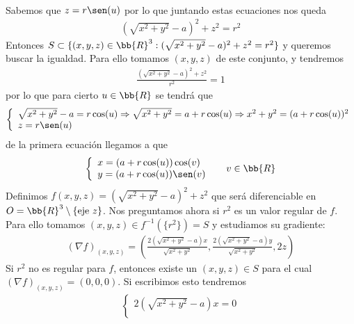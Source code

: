 \begin{ejemplo}
\begin{enumerate}
\begin{gather*}
        \end{gather*}
        Sabemos que $z=r\sen(u)$ por lo que juntando estas ecuaciones nos queda
        \begin{gather*}
            (\sqrt{x^2 + y^2}-a)^2 + z^2 = r^2
        \end{gather*}
        Entonces $S\subset \{(x,y,z)\in \bb{R}^3 : (\sqrt{x^2 + y^2}-a)^2 + z^2 = r^2\}$ y queremos buscar la igualdad. Para ello tomamos $(x,y,z)$ de este conjunto, y tendremos
        \begin{gather*}
            \frac{(\sqrt{x^2 + y^2}-a)^2 + z^2}{r^2} = 1
        \end{gather*}
        por lo que para cierto $u\in \bb{R}$ se tendrá que
        \begin{gather*}
            \left\{
            \begin{array}{l}
                \sqrt{x^2 + y^2} -a = r\cos(u) \Rightarrow \sqrt{x^2 + y^2} = a + r\cos(u) \Rightarrow x^2 + y^2 = (a+r\cos(u))^2\\
                z = r\sen(u) 
            \end{array}
            \right.
        \end{gather*}
        de la primera ecuación llegamos a que 
        \begin{gather*}
            \left\{
            \begin{array}{l}
                x = (a+r\cos(u))\cos(v)\\
                y = (a+r\cos(u))\sen(v)
            \end{array}
            \right. \ \ \ \ v\in \bb{R}
        \end{gather*}
        Definimos $f(x,y,z) = (\sqrt{x^2 + y^2} -a)^2 + z^2$ que será diferenciable en $O=\bb{R}^3 \setminus\{\text{eje }z\}$. Nos preguntamos ahora si $r^2$ es un valor regular de $f$. Para ello tomamos $(x,y,z)\in f^{-1}(\{r^2\})=S$ y estudiamos su gradiente:
        \begin{gather*}
            (\nabla f)_{(x,y,z)} = \left(\frac{2(\sqrt{x^2 + y^2} -a)x}{\sqrt{x^2 + y^2}}, \frac{2(\sqrt{x^2 + y^2} -a)y}{\sqrt{x^2 + y^2}}, 2z \right) 
        \end{gather*}
        Si $r^2$ no es regular para $f$, entonces existe un $(x,y,z)\in S$ para el cual $(\nabla f)_{(x,y,z)} = (0,0,0)$. Si escribimos esto tendremos
        \begin{gather*}
            \left\{
            \begin{array}{l}
                2(\sqrt{x^2 + y^2} -a)x = 0\\

\end{array}
\end{gather*}
\end{enumerate}
\end{ejemplo}
